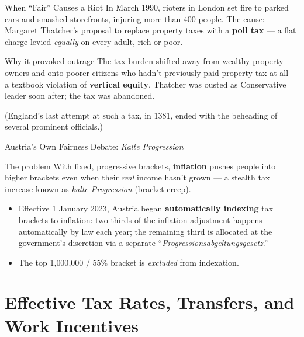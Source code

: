\documentclass[11pt,aspectratio=169]{beamer}
\begin{document}
\begin{frame}{When ``Fair'' Causes a Riot}
  \small
  In March 1990, rioters in London set fire to parked cars and smashed storefronts, injuring more than 400 people. The cause: Margaret Thatcher's proposal to replace property taxes with a \textbf{poll tax} --- a flat charge levied \emph{equally} on every adult, rich or poor.
  \vspace{0.3em}
  \begin{alertblock}{Why it provoked outrage}
    The tax burden shifted away from wealthy property owners and onto poorer citizens who hadn't previously paid property tax at all --- a textbook violation of \textbf{vertical equity}. Thatcher was ousted as Conservative leader soon after; the tax was abandoned.
  \end{alertblock}
  \vspace{0.3em}

  (England's last attempt at such a tax, in 1381, ended with the beheading of several prominent officials.)\\

\end{frame}

\begin{frame}{Austria's Own Fairness Debate: \emph{Kalte Progression}}
  \footnotesize
  \begin{block}{The problem}
    With fixed, progressive brackets, \textbf{inflation} pushes people into higher brackets even when their \emph{real} income hasn't grown --- a stealth tax increase known as \emph{kalte Progression} (bracket creep).
  \end{block}
  \vspace{0.3em}
  \begin{itemize}
    \item Effective 1 January 2023, Austria began \textbf{automatically indexing} tax brackets to inflation: two-thirds of the inflation adjustment happens automatically by law each year; the remaining third is allocated at the government's discretion via a separate ``\emph{Progressionsabgeltungsgesetz}.''
    \item The top \texteuro{}1{,}000{,}000 / 55\% bracket is \emph{excluded} from indexation.
  \end{itemize}


 \end{frame}

\section{Effective Tax Rates, Transfers, and Work Incentives}
\end{document}
